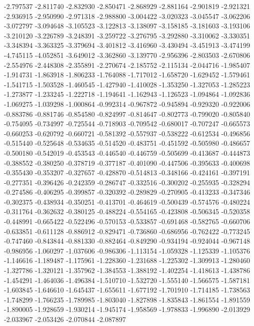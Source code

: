-2.797537
-2.811740
-2.832930
-2.850471
-2.868929
-2.881164
-2.901819
-2.921321
-2.936915
-2.950990
-2.971318
-2.988800
-3.004422
-3.020323
-3.045547
-3.062206
-3.072797
-3.094648
-3.105523
-3.122813
-3.138097
-3.158185
-3.181603
-3.193106
-3.210120
-3.226789
-3.248391
-3.259722
-3.276795
-3.292880
-3.310062
-3.330351
-3.348394
-3.363325
-3.379694
-3.401812
-3.416960
-3.430494
-3.451913
-3.474199
-4.745115
-4.052851
-3.649012
-3.362860
-3.139770
-2.956396
-2.803503
-2.670806
-2.554976
-2.448308
-2.355891
-2.270674
-2.185752
-2.115134
-2.044716
-1.985407
-1.914731
-1.863918
-1.806233
-1.764088
-1.717012
-1.658720
-1.629452
-1.579461
-1.541715
-1.503528
-1.460545
-1.427940
-1.410028
-1.353250
-1.327053
-1.285223
-1.273877
-1.233245
-1.222718
-1.194641
-1.162943
-1.126523
-1.094864
-1.092836
-1.069275
-1.039298
-1.000864
-0.992314
-0.967872
-0.945894
-0.929320
-0.922006
-0.883786
-0.881746
-0.854580
-0.824997
-0.814647
-0.802773
-0.799020
-0.805840
-0.754095
-0.734997
-0.725544
-0.718903
-0.709542
-0.680017
-0.707247
-0.665573
-0.660253
-0.620792
-0.660721
-0.581392
-0.557937
-0.538222
-0.612534
-0.496856
-0.515440
-0.525648
-0.534635
-0.514520
-0.483751
-0.451592
-0.505980
-0.486657
-0.500180
-0.542019
-0.453543
-0.446540
-0.446759
-0.505699
-0.413687
-0.444873
-0.388552
-0.380250
-0.378719
-0.377187
-0.401090
-0.447506
-0.395633
-0.400698
-0.355430
-0.353207
-0.327657
-0.428870
-0.514813
-0.348166
-0.424161
-0.397191
-0.277351
-0.396426
-0.242359
-0.286747
-0.332516
-0.300202
-0.255935
-0.328294
-0.274586
-0.406295
-0.399857
-0.320392
-0.289829
-0.270905
-0.413233
-0.347346
-0.302375
-0.438934
-0.350251
-0.413701
-0.464619
-0.500439
-0.574576
-0.480224
-0.311764
-0.362632
-0.380125
-0.488224
-0.554165
-0.423808
-0.506345
-0.520358
-0.448991
-0.665422
-0.522496
-0.570153
-0.533857
-0.691468
-0.582765
-0.660706
-0.633851
-0.611128
-0.886912
-0.829471
-0.736860
-0.686956
-0.762422
-0.773245
-0.747460
-0.843844
-0.881330
-0.882464
-0.849290
-0.934194
-0.924044
-0.967148
-0.986956
-1.060297
-1.037606
-0.986306
-1.113154
-1.059328
-1.125339
-1.105376
-1.146616
-1.189487
-1.175961
-1.228360
-1.231688
-1.225302
-1.309913
-1.280460
-1.327786
-1.320121
-1.357962
-1.384553
-1.388192
-1.402254
-1.418613
-1.438786
-1.454291
-1.464036
-1.496384
-1.510710
-1.532720
-1.555140
-1.566575
-1.587181
-1.603845
-1.646610
-1.645437
-1.655611
-1.677192
-1.701910
-1.714185
-1.738563
-1.748299
-1.766235
-1.789985
-1.803040
-1.827898
-1.835843
-1.861554
-1.891559
-1.890005
-1.928659
-1.930214
-1.945174
-1.958569
-1.978833
-1.996890
-2.013929
-2.033967
-2.053426
-2.070844
-2.087897
